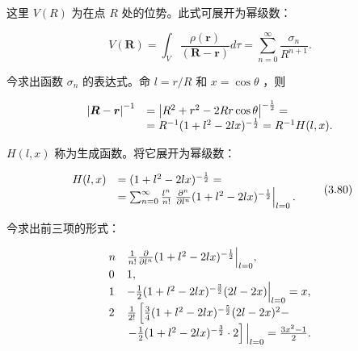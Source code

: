这里 $V(R)$ 为在点 $R$ 处的位势。此式可展开为幂级数：

\begin{equation*}
V (\boldsymbol {R}) = \int_ {V} \frac {\rho (\boldsymbol {r})}{(\boldsymbol {R} - \boldsymbol {r})} d \tau = \sum_ {n = 0} ^ {\infty} \frac {\sigma_ {n}}{R ^ {n + 1}}.
\end{equation*}

今求出函数 $\sigma_{n}$ 的表达式。命 $l = r / R$ 和 $x = \cos \theta$ ，则

\begin{equation*}
\begin{array}{r l} \left| \boldsymbol {R} - \boldsymbol {r} \right| ^ {- 1} & = \left| R ^ {2} + r ^ {2} - 2 R r \cos \theta \right| ^ {- \frac {1}{2}} = \\ & = R ^ {- 1} (1 + l ^ {2} - 2 l x) ^ {- \frac {1}{2}} = R ^ {- 1} H (l, x). \end{array}
\end{equation*}

$H(l,x)$ 称为生成函数。将它展开为幂级数：

\begin{equation*}
\begin{array}{r l} H (l, x) & = (1 + l ^ {2} - 2 l x) ^ {- \frac {1}{2}} = \\ & = \sum_ {n = 0} ^ {\infty} \frac {l ^ {n}}{n !} \left. \frac {\partial^ {n}}{\partial l ^ {n}} (1 + l ^ {2} - 2 l x) ^ {- \frac {1}{2}} \right| _ {l = 0}. \end{array}\tag{3.80}
\end{equation*}

今求出前三项的形式：

\begin{equation*}
\begin{array}{l l} n & \frac {1}{n !} \frac {\partial}{\partial l ^ {n}} (1 + l ^ {2} - 2 l x) ^ {- \frac {1}{2}} \Big | _ {l = 0}, \\ 0 & 1, \\ 1 & - \frac {1}{2} (1 + l ^ {2} - 2 l x) ^ {- \frac {3}{2}} (2 l - 2 x) \Big | _ {l = 0} = x, \\ 2 & \frac {1}{2 !} \left[ \frac {3}{4} (1 + l ^ {2} - 2 l x) ^ {- \frac {5}{2}} (2 l - 2 x) ^ {2} - \right. \\ & \left. - \frac {1}{2} (1 + l ^ {2} - 2 l x) ^ {- \frac {3}{2}} \cdot 2 \right] \Big | _ {l = 0} = \frac {3 x ^ {2} - 1}{2}. \end{array}
\end{equation*}


